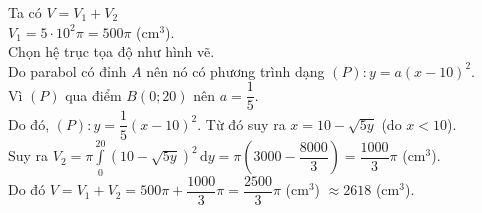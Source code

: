 \begin{ex}
{Ta có $ V=V_1+V_2$\\
$V_1=5\cdot 10^2\pi=500\pi$ (cm$^3$).\\
Chọn hệ trục tọa độ như hình vẽ.\\
Do parabol có đỉnh $ A$ nên nó có phương trình dạng $ (P)\colon y=a(x-10)^2$.\\
Vì $(P)$ qua điểm $B(0;20)$ nên $ a=\dfrac{1}{5}$.\\
Do đó, $(P)\colon y=\dfrac{1}{5}(x-10)^2$. Từ đó suy ra $ x=10-\sqrt{5y}$ (do $ x<10$).\\
Suy ra $V_2=\pi\displaystyle\int\limits_0^{20}\left(10-\sqrt{5y}\right)^2 \mathrm{\,d}y=\pi\left(3000-\dfrac{8000}{3}\right)=\dfrac{1000}{3}\pi$ (cm$^3$).\\
Do đó $ V=V_1+V_2=500\pi+\dfrac{1000}{3}\pi=\dfrac{2500}{3}\pi$ (cm$^3$) $\approx2618$ (cm$^3$).
}
\end{ex}

